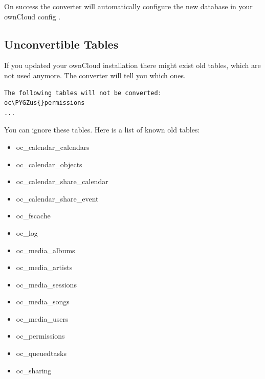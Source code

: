 \documentclass[letterpaper,10pt,english]{sphinxmanual}
\def\PYGZus{\char`\_}
\begin{document}
On success the converter will automatically configure the new database in your
ownCloud config .


\subsection{Unconvertible Tables}
\label{configuration_database/db_conversion:unconvertible-tables}
If you updated your ownCloud installation there might exist old tables, which
are not used anymore. The converter will tell you which ones.

\begin{Verbatim}[commandchars=\\\{\}]
The following tables will not be converted:
oc\PYGZus{}permissions
...
\end{Verbatim}

You can ignore these tables.
Here is a list of known old tables:
\begin{itemize}
\item {} 
oc\_calendar\_calendars

\item {} 
oc\_calendar\_objects

\item {} 
oc\_calendar\_share\_calendar

\item {} 
oc\_calendar\_share\_event

\item {} 
oc\_fscache

\item {} 
oc\_log

\item {} 
oc\_media\_albums

\item {} 
oc\_media\_artists

\item {} 
oc\_media\_sessions

\item {} 
oc\_media\_songs

\item {} 
oc\_media\_users

\item {} 
oc\_permissions

\item {} 
oc\_queuedtasks

\item {} 
oc\_sharing

\end{itemize}
\end{document}
